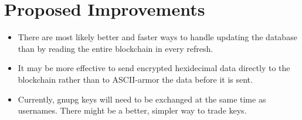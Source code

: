 \documentclass[]{article}
\begin{document}
\section{Proposed Improvements}
\begin{itemize}
  \item There are most likely better and faster ways to handle updating the database than by reading the entire blockchain in every refresh.
  \item It may be more effective to send encrypted hexidecimal data directly to the blockchain rather than to ASCII-armor the data before it is sent.
  \item Currently, gnupg keys will need to be exchanged at the same time as usernames. There might be a better, simpler way to trade keys. 
\end{itemize}

\pagebreak

  \printbibliography{}
\end{document}
